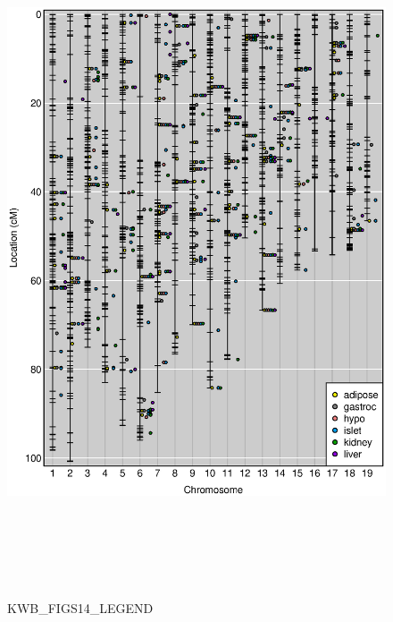 \documentclass[letterpaper,twoside]{article}
\begin{document}
\begin{figure}[p]
\centerline{\includegraphics[height=8.0in]{SuppFigs/figS14.eps}}

\caption{KWB_FIGS14_LEGEND}
\end{figure}




\clearpage
\end{document}
